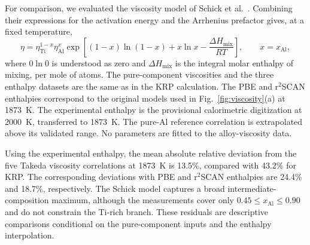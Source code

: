 
For comparison, we evaluated the viscosity model of Schick et al.~\cite{Schick2012}.
Combining their expressions for the activation energy and the Arrhenius prefactor
gives, at a fixed temperature,
\begin{equation}
\eta = \eta_{\mathrm{Ti}}^{1-x}\eta_{\mathrm{Al}}^{x}
\exp\!\left[(1-x)\ln(1-x)+x\ln x-
\frac{\Delta H_{\mathrm{mix}}}{RT}\right],
\qquad x=x_{\mathrm{Al}},
\end{equation}
where $0\ln0$ is understood as zero and $\Delta H_{\mathrm{mix}}$ is the
integral molar enthalpy of mixing, per mole of atoms. The pure-component
viscosities and the three enthalpy datasets are the same as in the KRP calculation.
The PBE and r$^2$SCAN enthalpies correspond to the original models used in
Fig.~\ref{fig:viscosity}(a) at 1873~K. The experimental enthalpy is the
provisional calorimetric digitization at 2000~K, transferred to 1873~K.
The pure-Al reference correlation is extrapolated above its validated range.
No parameters are fitted to the alloy-viscosity data.

Using the experimental enthalpy, the mean absolute relative deviation from
the five Takeda viscosity correlations at 1873~K is 13.5\%, compared with
43.2\% for KRP. The corresponding deviations with PBE and r$^2$SCAN
enthalpies are 24.4\% and 18.7\%, respectively.
The Schick model captures a broad intermediate-composition maximum, although
the measurements cover only $0.45\le x_{\mathrm{Al}}\le0.90$ and do not
constrain the Ti-rich branch. These residuals are descriptive comparisons
conditional on the pure-component inputs and the enthalpy interpolation.

